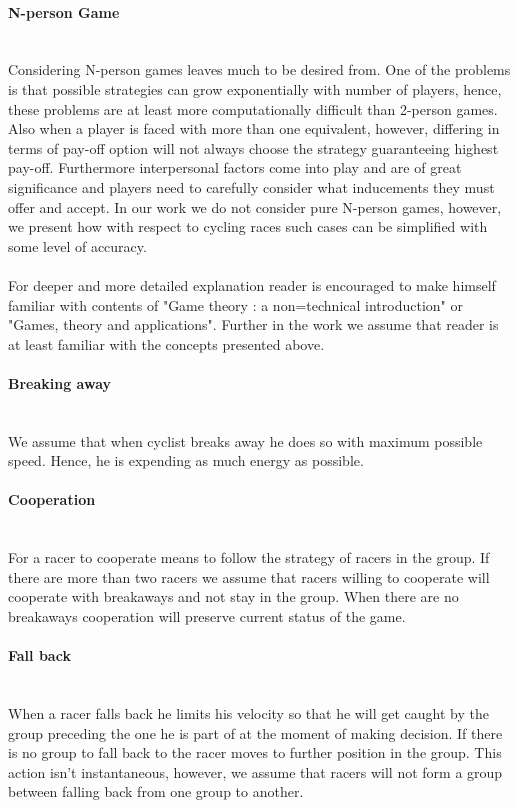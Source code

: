 \documentclass[10pt, a4paper]{report}
\begin{document}
\paragraph{N-person Game} ~\\
Considering N-person games leaves much to be desired from. One of the problems is that possible strategies can grow exponentially with number of players, hence, these problems are at least more computationally difficult than 2-person games. Also when a player is faced with more than one equivalent, however, differing in terms of pay-off option will not always choose the strategy guaranteeing highest pay-off. Furthermore interpersonal factors come into play and are of great significance and players need to carefully consider what inducements they must offer and accept. In our work we do not consider pure N-person games, however, we present how with respect to cycling races such cases can be simplified with some level of accuracy.
\\\\
For deeper and more detailed explanation reader is encouraged to make himself familiar with contents of "Game theory : a non=technical introduction"\cite{GameTheoryNonTechnical} or "Games, theory and applications"\cite{GameTheoryApplications}. Further in the work we assume that reader is at least familiar with the concepts presented above.

\paragraph{Breaking away} ~\\
We assume that when cyclist breaks away he does so with maximum possible speed. Hence, he is expending as much energy as possible.

\paragraph{Cooperation} ~\\
For a racer to cooperate means to follow the strategy of racers in the group. If there are more than two racers we assume that racers willing to cooperate will cooperate with breakaways and not stay in the group. When there are no breakaways cooperation will preserve current status of the game.

\paragraph{Fall back} ~\\
When a racer falls back he limits his velocity so that he will get caught by the group preceding the one he is part of at the moment of making decision. If there is no group to fall back to the racer moves to further position in the group. This action isn't instantaneous, however, we assume that racers will not form a group between falling back from one group to another.
\end{document}
